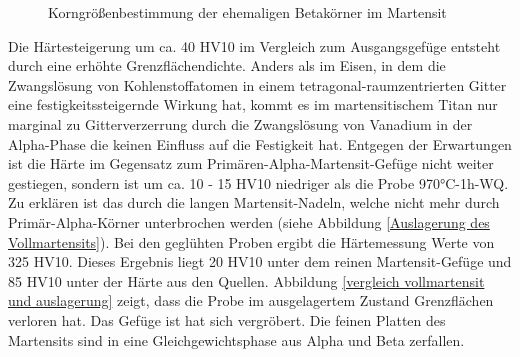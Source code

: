 \documentclass[a4paper, 11pt]{tubsreprt}
\begin{document}
\begin{figure}
\caption{Korngrößenbestimmung der ehemaligen Betakörner im Martensit}
\label{Korngroessenbestimmung Martensit}
\end{figure}

\newpage
Die Härtesteigerung um ca. 40 HV10 im Vergleich zum Ausgangsgefüge entsteht durch eine erhöhte Grenzflächendichte. Anders als im Eisen, in dem die Zwangslösung von Kohlenstoffatomen in einem tetragonal-raumzentrierten Gitter eine festigkeitssteigernde Wirkung hat, kommt es im martensitischem Titan nur marginal zu Gitterverzerrung durch die Zwangslösung von Vanadium in der Alpha-Phase die keinen Einfluss auf die Festigkeit hat. Entgegen der Erwartungen ist die Härte im Gegensatz zum Primären-Alpha-Martensit-Gefüge nicht weiter gestiegen, sondern ist um ca. 10 - 15 HV10 niedriger als die Probe 970°C-1h-WQ. Zu erklären ist das durch die langen Martensit-Nadeln, welche nicht mehr durch Primär-Alpha-Körner unterbrochen werden (siehe Abbildung \ref{Auslagerung des Vollmartensits}).
Bei den geglühten Proben ergibt die Härtemessung Werte von 325 HV10. Dieses Ergebnis liegt 20 HV10 unter dem reinen Martensit-Gefüge und 85 HV10 unter der Härte aus den Quellen.
Abbildung \ref{vergleich vollmartensit und auslagerung} zeigt, dass die Probe im ausgelagertem Zustand Grenzflächen verloren hat. Das Gefüge ist hat sich vergröbert. Die feinen Platten des Martensits sind in eine Gleichgewichtsphase aus Alpha und Beta zerfallen. 
\end{document}
